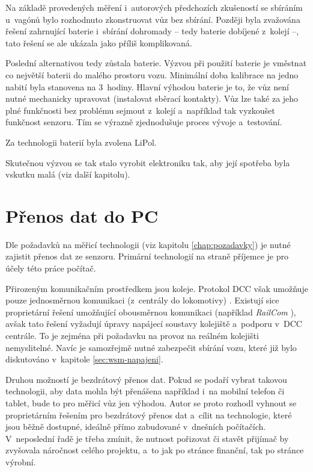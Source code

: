 Na základě provedených měření i~autorových předchozích zkušeností se sbíráním
u~vagónů bylo rozhodnuto zkonstruovat vůz bez sbírání. Později byla zvažována
řešení zahrnující baterie i~sbírání dohromady -- tedy baterie dobíjené z~kolejí
--, tato řešení se ale ukázala jako příliš komplikovaná.

Poslední alternativou tedy zůstala baterie. Výzvou při použití baterie je
vměstnat co největší baterii do malého prostoru vozu. Minimální doba kalibrace
na jedno nabití byla stanovena na 3~hodiny. Hlavní výhodou baterie je to, že
vůz není nutné mechanicky upravovat (instalovat sběrací kontakty). Vůz lze také
za jeho plné funkčnosti bez problému sejmout z~kolejí a~například tak vyzkoušet
funkčnost senzoru. Tím se výrazně zjednodušuje proces vývoje a~testování.

Za technologii baterií byla zvolena LiPol.

Skutečnou výzvou se tak stalo vyrobit elektroniku tak, aby její spotřeba byla
vskutku malá (viz další kapitolu).

\section{Přenos dat do PC}
\label{sec:wsm-prenos-pc}

Dle požadavků na měřicí technologii (viz kapitolu \ref{chap:pozadavky}) je
nutné zajistit přenos dat ze senzoru. Primární technologií na straně
příjemce je pro účely této práce počítač.

Přirozeným komunikačním prostředkem jsou koleje. Protokol \gls{DCC}
\cite{nmra:dcc:proto} však umožňuje pouze jednosměrnou komunikaci (z~centrály
do lokomotivy) \cite{nmra:dcc:proto}. Existují sice proprietární řešení
umožňující obousměrnou komunikaci (například \textit{RailCom} \cite{railcom}),
avšak tato řešení vyžadují úpravy napájecí soustavy kolejiště a~podporu
v~\gls{DCC} centrále. To je zejména při požadavku na provoz na reálném
kolejišti nemyslitelné. Navíc je samozřejmě nutné zabezpečit sbírání vozu,
které již bylo diskutováno v~kapitole \ref{sec:wsm-napajeni}.

Druhou možností je bezdrátový přenos dat. Pokud se podaří vybrat takovou
technologii, aby data mohla být přenášena například i~na mobilní telefon či
tablet, bude to pro měřicí vůz jen výhodou. Autor se proto rozhodl vyhnout se
proprietárním řešením pro bezdrátový přenos dat a~cílit na technologie, které
jsou běžně dostupné, ideálně přímo zabudované v~dnešních počítačích.
V~neposlední řadě je třeba zmínit, že nutnost pořizovat či stavět přijímač by
zvyšovala náročnost celého projektu, a~to jak po stránce finanční, tak po
stránce výrobní.

